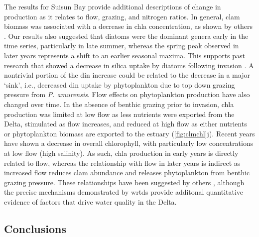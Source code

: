 \documentclass[letterpaper,12pt,oneside]{article}\usepackage[]{graphicx}\usepackage[]{color}
\begin{document}
The results for Suisun Bay provide additional descriptions of change in production as it relates to flow, grazing, and nitrogen ratios.  In general, clam biomass was associated with a decrease in \ac{chla} concentration, as shown by others \citep{Alpine92,Thompson08}. Our results also suggested that diatoms were the dominant genera early in the time series, particularly in late summer, whereas the spring peak observed in later years represents a shift to an earlier seasonal maxima. This supports past research that showed a decrease in silica uptake by diatoms following invasion \citep{Cloern96,Kimmerer05}. A nontrivial portion of the \ac{din} increase could be related to the decrease in a major `sink', i.e., decreased \ac{din} uptake by phytoplankton due to top down grazing pressure from \textit{P. amurensis}.  Flow effects on phytoplankton production have also changed over time. In the absence of benthic grazing prior to invasion, \ac{chla} production was limited at low flow as less nutrients were exported from the Delta, stimulated as flow increases, and reduced at high flow as either nutrients or phytoplankton biomass are exported to the estuary (\cref{fig:clmchl}j). Recent years have shown a decrease in overall chlorophyll, with particularly low concentrations at low flow (high salinity).  As such, \ac{chla} production in early years is directly related to flow, whereas the relationship with flow in later years is indirect as increased flow reduces clam abundance and releases phytoplankton from benthic grazing pressure. These relationships have been suggested by others \citep{Cloern83,Alpine92,Parchaso02,Jassby08}, although the precise mechanisms demonstrated by \ac{wrtds} provide additonal quantitative evidence of factors that drive water quality in the Delta.
 
\subsection{Conclusions}
\end{document}
